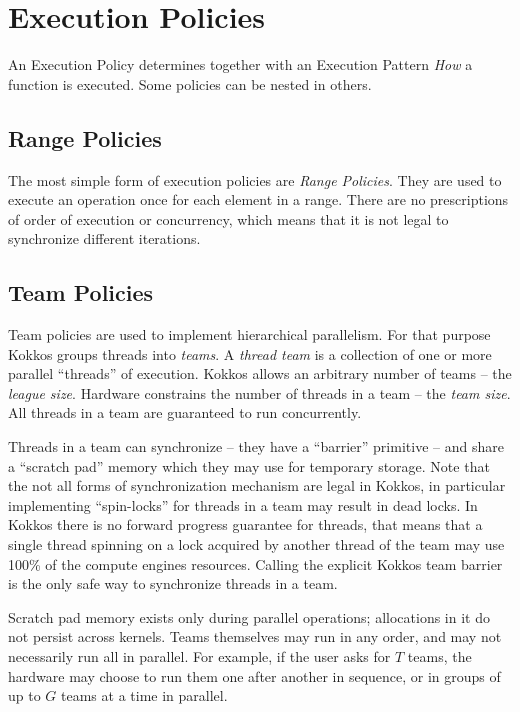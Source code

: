 \section{Execution Policies}

An Execution Policy determines together with an Execution Pattern {\it How} a function is executed.
Some policies can be nested in others.

\subsection{Range Policies}

The most simple form of execution policies are {\it Range Policies}. 
They are used to execute an operation once for each element in a range. 
There are no prescriptions of order of execution or concurrency, which means that it is not legal
to synchronize different iterations. 

\subsection{Team Policies}

Team policies are used to implement hierarchical parallelism. 
For that purpose Kokkos groups threads into \emph{teams}.
A \emph{thread team} is a collection of one or more parallel ``threads'' of execution.
Kokkos allows an arbitrary number of teams -- the \emph{league size}.
Hardware constrains the number of threads in a team -- the \emph{team size}.
All threads in a team are guaranteed to run concurrently. 

Threads in a team can synchronize -- they have a ``barrier'' primitive -- 
and share a ``scratch pad'' memory which they may use for temporary storage.
Note that the not all forms of synchronization mechanism are legal in Kokkos, in particular
implementing ``spin-locks'' for threads in a team may result in dead locks. 
In Kokkos there is no forward progress guarantee for threads, that means that a single thread spinning
on a lock acquired by another thread of the team may use 100\% of the compute engines resources.
Calling the explicit Kokkos team barrier is the only safe way to synchronize threads in a team.

Scratch pad memory exists only during parallel operations;
allocations in it do not persist across kernels.
Teams themselves may run in any order,
and may not necessarily run all in parallel.
For example, if the user asks for $T$ teams,
the hardware may choose to run them one after another in sequence,
or in groups of up to $G$ teams at a time in parallel.

